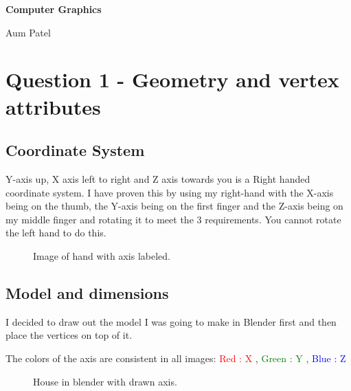 \documentclass[10pt]{report}
\begin{document}
\begin{titlepage}
\center
{\huge\bfseries Computer Graphics 

Aum Patel
}

\end{titlepage}
\tableofcontents
\chapter{Question 1 - Geometry and vertex attributes}

\section{Coordinate System}
Y-axis up, X axis left to right and Z axis towards you is a Right handed coordinate system. I have proven this by using my right-hand with the X-axis being on the thumb, the Y-axis being on the first finger and the Z-axis being on my middle finger and rotating it to meet the 3 requirements. You cannot rotate the left hand to do this.

\begin{figure}[H]
    \centering
    \caption{Image of hand with axis labeled.}
\end{figure}

\section{Model and dimensions}
I decided to draw out the model I was going to make in Blender first and then place the vertices on top of it. 

The colors of the axis are consistent in all images: \textcolor{red}{Red : X} , \textcolor{green}{Green : Y} , \textcolor{blue}{Blue : Z}

\begin{figure}[H]
    \centering
    \caption{House in blender with drawn axis.}
\end{figure}
\end{document}
